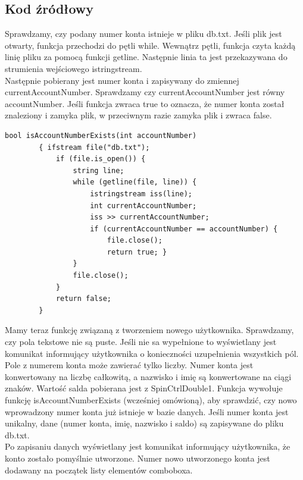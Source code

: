\documentclass[a4paper,12pt]{article}
\begin{document}
\subsection{Kod źródłowy}
Sprawdzamy, czy podany numer konta istnieje w pliku db.txt. Jeśli plik jest otwarty, funkcja przechodzi do pętli while. Wewnątrz pętli, funkcja czyta każdą linię pliku za pomocą funkcji getline.
Następnie linia ta jest przekazywana do strumienia wejściowego istringstream.\\
Następnie pobierany jest numer konta i zapisywany do zmiennej currentAccountNumber. Sprawdzamy czy currentAccountNumber jest równy accountNumber.
Jeśli funkcja zwraca true to oznacza, że numer konta został znaleziony i zamyka plik, w przeciwnym razie zamyka plik i zwraca false.

	\lstset {language=C++}
	\begin{lstlisting}
bool isAccountNumberExists(int accountNumber)
		{ ifstream file("db.txt");
			if (file.is_open()) {
				string line;
				while (getline(file, line)) {
					istringstream iss(line);
					int currentAccountNumber;
					iss >> currentAccountNumber;
					if (currentAccountNumber == accountNumber) {
						file.close();
						return true; }
				}
				file.close();
			}
			return false;
		}
	\end{lstlisting} 
Mamy teraz funkcję związaną z tworzeniem nowego użytkownika. Sprawdzamy, czy pola tekstowe  nie są puste. Jeśli nie sa wypełnione to wyświetlany jest komunikat informujący użytkownika o konieczności uzupełnienia wszystkich pól.
Pole z numerem konta może zawierać tylko liczby.
Numer konta jest konwertowany na liczbę całkowitą, a nazwisko i imię są konwertowane na ciągi znaków.
Wartość salda pobierana jest z SpinCtrlDouble1.
Funkcja wywołuje funkcję isAccountNumberExists (wcześniej omówioną), aby sprawdzić, czy nowo wprowadzony numer konta już istnieje w bazie danych.
Jeśli numer konta jest unikalny, dane (numer konta, imię, nazwisko i saldo) są zapisywane do pliku db.txt. \\
Po zapisaniu danych wyświetlany jest komunikat informujący użytkownika, że konto zostało pomyślnie utworzone.
Numer nowo utworzonego konta jest dodawany na początek listy elementów comboboxa.
	\newpage
\end{document}
